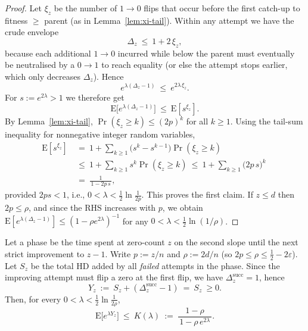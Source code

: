 \documentclass[lettersize,journal]{IEEEtran}
\newcommand{\EE}{\text{E}}
\begin{document}
\begin{proof}
	Let $\xi_z$ be the number of $1\!\to 0$ flips that occur before the first catch-up to fitness $\ge$ parent (as in Lemma~\ref{lem:xi-tail}).
	Within any attempt we have the crude envelope
	\[
	\Delta_z\ \le\ 1+2\,\xi_z,
	\]
	because each additional $1\!\to 0$ incurred while below the parent must eventually be neutralised by a $0\!\to 1$ to reach equality (or else the attempt stops earlier, which only decreases $\Delta_z$).
	Hence
	\[
	e^{\lambda(\Delta_z-1)}\ \le\ e^{2\lambda\,\xi_z}.
	\]
	For $s:=e^{2\lambda}>1$ we therefore get
	\[
	\EE\!\big[e^{\lambda(\Delta_z-1)}\big]\ \le\ \EE[s^{\xi_z}].
	\]
	By Lemma~\ref{lem:xi-tail}, $\Pr(\xi_z\ge k)\le (2p)^k$ for all $k\ge 1$.
	Using the tail-sum inequality for nonnegative integer random variables,
	\begin{align*}
	\EE[s^{\xi_z}]
	\ &=\ 1+\sum_{k\ge 1}\big(s^{k}-s^{k-1}\big)\Pr(\xi_z\ge k)
	\ \\&\le\ 1+\sum_{k\ge 1}s^{k}\Pr(\xi_z\ge k)
	\ \le\ 1+\sum_{k\ge 1}\big(2p\,s\big)^{k}
	\ \\ &=\ \frac{1}{\,1-2p\,s\,},
	\end{align*}
	provided $2ps<1$, i.e., $0<\lambda<\tfrac12\ln\!\tfrac{1}{2p}$. This proves the first claim.
	If $z\le d$ then $2p\le\rho$, and since the RHS increases with $p$, we obtain
	\(
	\EE[e^{\lambda(\Delta_z-1)}]\le (1-\rho e^{2\lambda})^{-1}
	\)
	for any $0<\lambda<\tfrac12\ln(1/\rho)$.
\end{proof}

\begin{lemma}\label{lem:phase-mgf}
	Let a phase be the time spent at zero-count $z$ on the second slope until the next strict improvement to $z-1$.
	Write $p:=z/n$ and $\rho:=2d/n$ (so $2p\le \rho \le \tfrac12-2\varepsilon$).
	Let $S_z$ be the total HD added by all \emph{failed} attempts in the phase.
	Since the improving attempt must flip a zero at the first flip, we have $\Delta^{\mathrm{succ}}_z=1$, hence
	\[
	Y_z\ :=\ S_z+(\Delta^{\mathrm{succ}}_z-1)\ =\ S_z\ \ge 0.
	\]
	Then, for every $0<\lambda<\tfrac12\ln\frac{1}{2\rho}$,
	\[
	\EE\!\big[e^{\lambda Y_z}\big]\ \le\ K(\lambda)\ :=\ \frac{1-\rho}{\,1-\rho\,e^{2\lambda}\,}.
	\]
\end{lemma}
\end{document}
